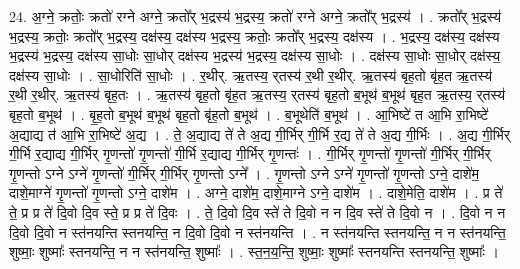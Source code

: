 \documentclass[17pt]{extarticle}
\begin{document}
24. अ॒ग्ने॒ क्रतोः॒ क्रतो॑ रग्ने अग्ने॒ क्रतो᳚र् भ॒द्रस्य॑ भ॒द्रस्य॒ क्रतो॑ रग्ने अग्ने॒ क्रतो᳚र् भ॒द्रस्य॑ । . क्रतो᳚र् भ॒द्रस्य॑ भ॒द्रस्य॒ क्रतोः॒ क्रतो᳚र् भ॒द्रस्य॒ दक्ष॑स्य॒ दक्ष॑स्य भ॒द्रस्य॒ क्रतोः॒ क्रतो᳚र् भ॒द्रस्य॒ दक्ष॑स्य । . भ॒द्रस्य॒ दक्ष॑स्य॒ दक्ष॑स्य भ॒द्रस्य॑ भ॒द्रस्य॒ दक्ष॑स्य सा॒धोः सा॒धोर् दक्ष॑स्य भ॒द्रस्य॑ भ॒द्रस्य॒ दक्ष॑स्य सा॒धोः । . दक्ष॑स्य सा॒धोः सा॒धोर् दक्ष॑स्य॒ दक्ष॑स्य सा॒धोः । . सा॒धोरिति॑ सा॒धोः । . र॒थीर्. ऋ॒तस्य॒ र्‌‍तस्य॑ र॒थी र॒थीर्. ऋ॒तस्य॑ बृह॒तो बृ॑ह॒त ऋ॒तस्य॑ र॒थी र॒थीर्. ऋ॒तस्य॑ बृह॒तः । . ऋ॒तस्य॑ बृह॒तो बृ॑ह॒त ऋ॒तस्य॒ र्‌तस्य॑ बृह॒तो ब॒भूथ॑ ब॒भूथ॑ बृह॒त ऋ॒तस्य॒ र्‌तस्य॑ बृह॒तो ब॒भूथ॑ । . बृ॒ह॒तो ब॒भूथ॑ ब॒भूथ॑ बृह॒तो बृ॑ह॒तो ब॒भूथ॑ । . ब॒भूथेति॑ ब॒भूथ॑ । . आ॒भिष्टे॑ त आ॒भि रा॒भिष्टे॑ अ॒द्याद्य त॑ आ॒भि रा॒भिष्टे॑ अ॒द्य । . ते॒ अ॒द्याद्य ते॑ ते अ॒द्य गी॒र्भिर् गी॒र्भि र॒द्य ते॑ ते अ॒द्य गी॒र्भिः । . अ॒द्य गी॒र्भिर् गी॒र्भि र॒द्याद्य गी॒र्भिर् गृ॒णन्तो॑ गृ॒णन्तो॑ गी॒र्भि र॒द्याद्य गी॒र्भिर् गृ॒णन्तः॑ । . गी॒र्भिर् गृ॒णन्तो॑ गृ॒णन्तो॑ गी॒र्भिर् गी॒र्भिर् गृ॒णन्तो ऽग्ने ऽग्ने॑ गृ॒णन्तो॑ गी॒र्भिर् गी॒र्भिर् गृ॒णन्तो ऽग्ने᳚ । . गृ॒णन्तो ऽग्ने ऽग्ने॑ गृ॒णन्तो॑ गृ॒णन्तो ऽग्ने॒ दाशे॑म॒ दाशे॒माग्ने॑ गृ॒णन्तो॑ गृ॒णन्तो ऽग्ने॒ दाशे॑म । . अग्ने॒ दाशे॑म॒ दाशे॒माग्ने ऽग्ने॒ दाशे॑म । . दाशे॒मेति॒ दाशे॑म । . प्र ते॑ ते॒ प्र प्र ते॑ दि॒वो दि॒व स्ते॒ प्र प्र ते॑ दि॒वः । . ते॒ दि॒वो दि॒व स्ते॑ ते दि॒वो न न दि॒व स्ते॑ ते दि॒वो न । . दि॒वो न न दि॒वो दि॒वो न स्त॑नयन्ति स्तनयन्ति॒ न दि॒वो दि॒वो न स्त॑नयन्ति । . न स्त॑नयन्ति स्तनयन्ति॒ न न स्त॑नयन्ति॒ शुष्माः॒ शुष्माः᳚ स्तनयन्ति॒ न न स्त॑नयन्ति॒ शुष्माः᳚ । . स्त॒न॒य॒न्ति॒ शुष्माः॒ शुष्माः᳚ स्तनयन्ति स्तनयन्ति॒ शुष्माः᳚ । \newline
\end{document}

